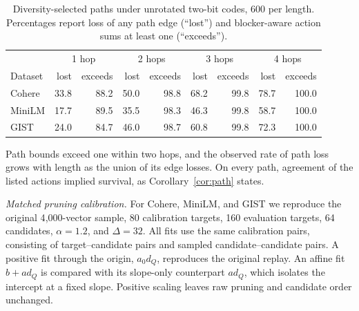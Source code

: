 \begin{table}[tbp]
\centering


\small
\begin{tabular}{lrrrrrrrr}
\toprule
& \multicolumn{2}{c}{1 hop} & \multicolumn{2}{c}{2 hops} & \multicolumn{2}{c}{3 hops} & \multicolumn{2}{c}{4 hops}\\
Dataset & lost & exceeds & lost & exceeds & lost & exceeds & lost & exceeds \\
\midrule
Cohere & 33.8 & 88.2 & 50.0 & 98.8 & 68.2 & 99.8 & 78.7 & 100.0 \\
MiniLM & 17.7 & 89.5 & 35.5 & 98.3 & 46.3 & 99.8 & 58.7 & 100.0 \\
GIST & 24.0 & 84.7 & 46.0 & 98.7 & 60.8 & 99.8 & 72.3 & 100.0 \\
\bottomrule
\end{tabular}

\small
\caption{Diversity-selected paths under unrotated two-bit codes, 600 per length. Percentages report loss of any path edge (``lost'') and blocker-aware action sums at least one (``exceeds'').}
\label{tab:app-paths}
\end{table}

Path bounds exceed one within two hops, and the observed rate of path loss grows with length as the union of its edge losses. On every path, agreement of the listed actions implied survival, as Corollary~\ref{cor:path} states.

\noindent\emph{Matched pruning calibration.}\quad
For Cohere, MiniLM, and GIST we reproduce the original 4{,}000-vector sample, 80 calibration targets, 160 evaluation targets, 64 candidates, $\alpha=1.2$, and $\Delta=32$. All fits use the same calibration pairs, consisting of target--candidate pairs and sampled candidate--candidate pairs. A positive fit through the origin, $a_0d_Q$, reproduces the original replay. An affine fit $b+ad_Q$ is compared with its slope-only counterpart $ad_Q$, which isolates the intercept at a fixed slope. Positive scaling leaves raw pruning and candidate order unchanged.

